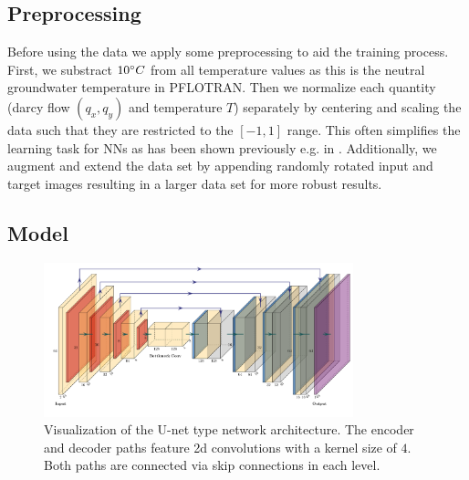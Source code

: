 \documentclass{article} %
\begin{document}
\subsection*{Preprocessing}
Before using the data we apply some preprocessing to aid the training process.
First, we substract $10 \degree C$ from all temperature values as this is the neutral groundwater temperature in PFLOTRAN.
Then we normalize each quantity (darcy flow $(q_x, q_y)$ and temperature $T$) separately by centering and scaling the data such that they are restricted to the $[-1, 1]$ range.
This often simplifies the learning task for NNs as has been shown previously e.g. in \citep{LeCun2012,Wiesler2011}.
Additionally, we augment and extend the data set by appending randomly rotated input and target images resulting in a larger data set for more robust results.


\subsection*{Model}
\begin{figure}[!htb]
   \centering
   \includegraphics[width=0.8\textwidth]{img/arch.pdf}
   \caption{Visualization of the U-net type network architecture. The encoder and decoder paths feature 2d convolutions with a kernel size of $4$. Both paths are connected via skip connections in each level.}
   \label{fig:arch}
\end{figure}
\end{document}

